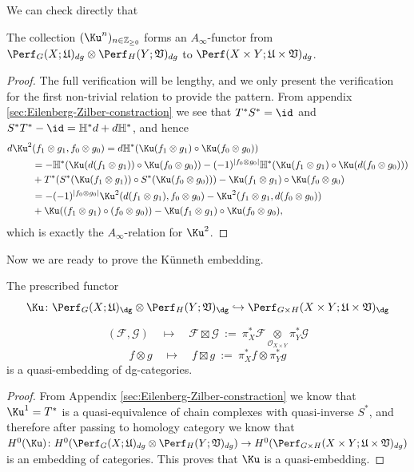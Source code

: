 We can check directly that
\begin{prp}
    The collection $(\Ku^n)_{n\in\mathbb{Z}_{\geq 0}}$ forms an $A_{\infty}$-functor from $\Perf_G (X;\mathfrak{U})_{dg}\otimes\Perf_H (Y;\mathfrak{V})_{dg}$ to $\Perf (X\times Y;\mathfrak{U}\times\mathfrak{V})_{dg}$.
\end{prp}
\begin{proof}
    The full verification will be lengthy, and we only present the verification for the first non-trivial relation to provide the pattern. From appendix \ref{sec:Eilenberg-Zilber-constraction} we see that $T^{\ast} S^{\ast} =\id$ and $S^{\ast} T^{\ast} -\id =\mathbb{H}^{\ast}d+d\mathbb{H}^{\ast}$, and hence 
    \begin{align*}
        d\Ku^2& (f_1\otimes g_1,f_0\otimes g_0)=d\mathbb{H}^{\ast} (\Ku (f_1\otimes g_1)\circ\Ku (f_0\otimes g_0))\\ 
        &=-\mathbb{H}^{\ast} (\Ku (d(f_1\otimes g_1))\circ \Ku (f_0\otimes g_0)) -(-1)^{\vert f_0\otimes g_0\vert }\mathbb{H}^{\ast} (\Ku(f_1\otimes g_1)\circ\Ku (d(f_0\otimes g_0)))\\
        &+T^{\ast} (S^{\ast}(\Ku (f_1\otimes g_1))\circ S^{\ast} (\Ku (f_0\otimes g_0))) -\Ku (f_1\otimes g_1)\circ\Ku (f_0\otimes g_0)\\ 
        &=-(-1)^{\vert f_0\otimes g_0\vert }\Ku^2 (d(f_1\otimes g_1),f_0\otimes g_0) - \Ku^2(f_1\otimes g_1,d(f_0\otimes g_0))\\ 
        &+\Ku((f_1\otimes g_1)\circ (f_0\otimes g_0))-\Ku (f_1\otimes g_1)\circ\Ku (f_0\otimes g_0),
    \end{align*}
    which is exactly the $A_{\infty}$-relation for $\Ku^2$. 
\end{proof}
Now we are ready to prove the K\"unneth embedding.
\begin{thm}\label{thm:Kunneth-embedding}
The prescribed functor
$$
\Ku\colon\Perf_G(X;\mathfrak{U})_{\dg}
\otimes
\Perf_H(Y;\mathfrak{V})_{\dg}
\hookrightarrow
\Perf_{G\times H}(X\times Y;\mathfrak{U}\times\mathfrak{V})_{\dg}
$$

$$
(\mathcal{F},\mathcal{G})
\quad\mapsto\quad
\mathcal{F}\boxtimes\mathcal{G}
~:=~
\pi_X^*\mathcal{F}
\underset{\mathcal{O}_{X\times Y}}{\otimes}
\pi_Y^*\mathcal{G}
$$
$$
f\otimes g
\quad\mapsto\quad
f\boxtimes g
~:=~
\pi_X^*f
\otimes
\pi_Y^*g
$$
is a quasi-embedding of dg-categories.
\end{thm}
\begin{proof}
    From Appendix \ref{sec:Eilenberg-Zilber-constraction} we know that $\Ku^1 =T^{\ast}$ is a quasi-equivalence of chain complexes with quasi-inverse $S^{\ast}$, and therefore after passing to homology category we know that $H^0 (\Ku)\colon H^0 (\Perf_G (X;\mathfrak{U})_{dg}\otimes\Perf_H (Y;\mathfrak{V})_{dg})\to H^0 (\Perf_{G\times H} (X\times Y;\mathfrak{U}\times\mathfrak{V})_{dg})$ is an embedding of categories. This proves that $\Ku$ is a quasi-embedding.
\end{proof}

